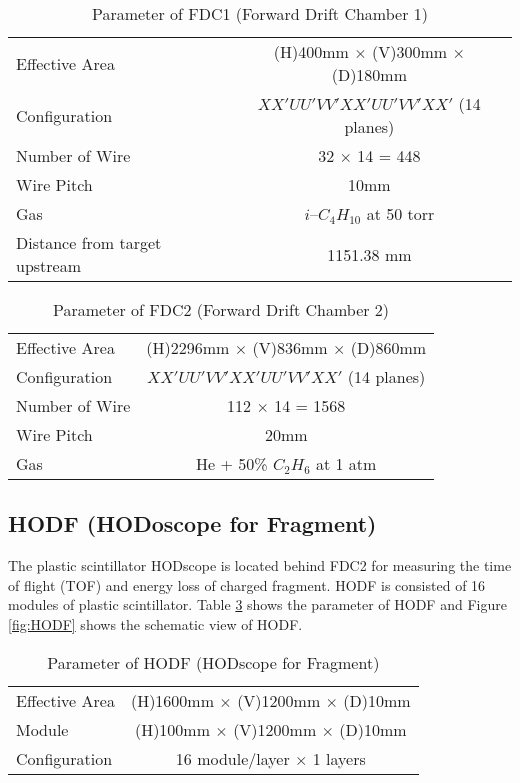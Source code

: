 \begin{table}[h]
    \centering
    \begin{tabular}{l|c}
        \hline
        Effective Area & (H)400mm $\times$ (V)300mm $\times$ (D)180mm\\
        Configuration & $XX'UU'VV'XX'UU'VV'XX'$ (14 planes)\\
        Number of Wire & 32 $\times$ 14 = 448 \\
        Wire Pitch & 10mm \\
        Gas & $i$--${C}_{4} {H}_{10}$ at 50 torr\\
        Distance from target upstream & 1151.38 mm  \\
        \hline
    \end{tabular}
    \caption{Parameter of FDC1 (Forward Drift Chamber 1) \cite{SAMURAI}}
    \label{tab:FDC1}
\end{table}

\begin{table}[h]
    \centering
    \begin{tabular}{l|c}
        \hline
        Effective Area & (H)2296mm $\times$ (V)836mm $\times$ (D)860mm\\
        Configuration & $XX'UU'VV'XX'UU'VV'XX'$ (14 planes)\\
        Number of Wire & 112 $\times$ 14 = 1568 \\
        Wire Pitch & 20mm \\
        Gas & He + 50\% ${C}_{2} {H}_{6}$ at 1 atm\\
        \hline
    \end{tabular}
    \caption{Parameter of FDC2 (Forward Drift Chamber 2) \cite{SAMURAI}}
    \label{tab:FDC2}
\end{table}

\subsection{HODF (HODoscope for Fragment)}
The plastic scintillator HODscope is located behind FDC2 for measuring the time of flight (TOF) and energy loss of charged fragment. HODF is consisted of 16 modules of plastic scintillator. Table \ref{tab:HODF} shows the parameter of HODF and Figure \ref{fig:HODF} shows the schematic view of HODF.

\begin{table}[h]
    \centering
    \begin{tabular}{l|c}
        \hline
        Effective Area & (H)1600mm $\times$ (V)1200mm $\times$ (D)10mm\\
        Module & (H)100mm $\times$ (V)1200mm $\times$ (D)10mm\\
        Configuration & 16 module/layer $\times$ 1 layers \\
        \hline
    \end{tabular}
    \caption{Parameter of HODF (HODscope for Fragment) \cite{SAMURAI}}
    \label{tab:HODF}
\end{table}

